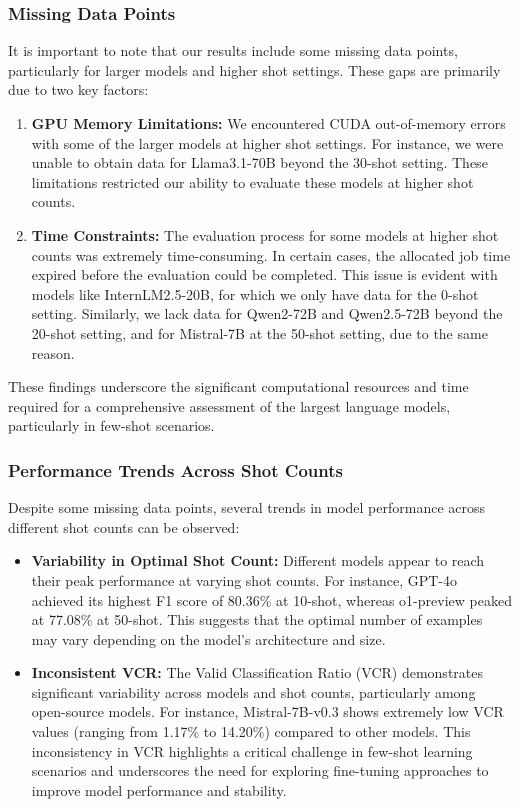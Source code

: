 \subsubsection{Missing Data Points}
It is important to note that our results include some missing data points, particularly for larger models and higher shot settings. These gaps are primarily due to two key factors:

\begin{enumerate}
    \item \textbf{GPU Memory Limitations:} We encountered CUDA out-of-memory errors with some of the larger models at higher shot settings. For instance, we were unable to obtain data for Llama3.1-70B beyond the 30-shot setting. These limitations restricted our ability to evaluate these models at higher shot counts.

    \item \textbf{Time Constraints:} The evaluation process for some models at higher shot counts was extremely time-consuming. In certain cases, the allocated job time expired before the evaluation could be completed. This issue is evident with models like InternLM2.5-20B, for which we only have data for the 0-shot setting. Similarly, we lack data for Qwen2-72B and Qwen2.5-72B beyond the 20-shot setting, and for Mistral-7B at the 50-shot setting, due to the same reason.
\end{enumerate}

These findings underscore the significant computational resources and time required for a comprehensive assessment of the largest language models, particularly in few-shot scenarios.

\subsubsection{Performance Trends Across Shot Counts}
Despite some missing data points, several trends in model performance across different shot counts can be observed:

\begin{itemize}
    \item \textbf{Variability in Optimal Shot Count:} Different models appear to reach their peak performance at varying shot counts. For instance, GPT-4o achieved its highest F1 score of 80.36\% at 10-shot, whereas o1-preview peaked at 77.08\% at 50-shot. This suggests that the optimal number of examples may vary depending on the model's architecture and size.
    
    \item \textbf{Inconsistent VCR:} The Valid Classification Ratio (VCR) demonstrates significant variability across models and shot counts, particularly among open-source models. For instance, Mistral-7B-v0.3 shows extremely low VCR values (ranging from 1.17\% to 14.20\%) compared to other models. This inconsistency in VCR highlights a critical challenge in few-shot learning scenarios and underscores the need for exploring fine-tuning approaches to improve model performance and stability.
\end{itemize}

